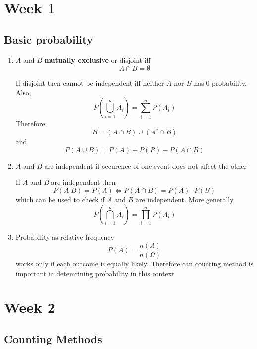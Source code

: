 \documentclass[11pt]{article}
\begin{document}
\section*{Week 1}

\subsection*{Basic probability}

\begin{enumerate}
  \item $A$ and $B$ \textbf{mutually exclusive} or disjoint iff
  \[
    A \cap B = \emptyset
  \]
  \begin{rem}
    If disjoint then cannot be independent iff neither $A$ nor $B$ has 0 probability. Also,
    \[
      P(\bigcup_{i=1}^n A_i) = \sum_{i=1}^{n} P(A_i)
    \]
    Therefore
    \[
      B = (A\cap B)\cup (A^c \cap B)
    \]
    and
    \[
      P(A\cup B) = P(A) + P(B) - P(A\cap B)
    \]
  \end{rem}
  \item $A$ and $B$ are independent if occurence of one event does not affect the other
  \begin{rem}
    If $A$ and $B$ are independent then
    \[
      P(A|B) = P(A) \iff P(A\cap B) = P(A)\cdot P(B)
    \]
    which can be used to check if $A$ and $B$ are independent. More generally
    \[
      P(\bigcap_{i=1}^{n} A_i) = \prod_{i=1}^n P(A_i)
    \]
  \end{rem}
  \item Probability as relative frequency
  \[
    P(A) = \frac{n(A)}{n(\Omega)}
  \]
  works only if each outcome is equally likely. Therefore can counting method is important in detemrining probability in this context
\end{enumerate}

\section*{Week 2}
\subsection*{Counting Methods}
\end{document}

